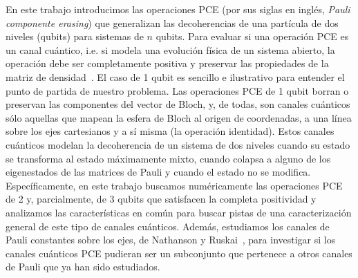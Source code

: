 En este trabajo introducimos las operaciones PCE 
(por sus siglas en inglés, \textit{Pauli componente erasing}) que generalizan 
las decoherencias de una partícula de dos niveles (qubits) para sistemas 
de $n$ qubits. 
Para evaluar si una operación PCE es un canal cuántico, i.e. si modela una evolución
física de un sistema abierto, la operación debe ser completamente positiva
y preservar las propiedades de la matriz de densidad~\citep{bengtsson_zyczkowski_2017}.
El caso de 1 qubit es sencillo e ilustrativo para entender el punto de partida de nuestro problema. 
Las operaciones PCE de 1 qubit borran 
o preservan las componentes del vector de Bloch, y, de todas, son canales 
cuánticos sólo aquellas que mapean 
la esfera de Bloch al origen de coordenadas, a una línea sobre 
los ejes cartesianos y a sí misma (la operación
identidad). Estos canales cuánticos modelan la decoherencia de un
sistema de dos niveles cuando su estado se transforma al estado máximamente 
mixto, cuando colapsa a alguno de los eigenestados
de las matrices de Pauli y cuando el estado no se modifica. 
Específicamente, en este trabajo buscamos numéricamente las operaciones 
PCE de 2 y, parcialmente, de 3 qubits que satisfacen la completa positividad 
y analizamos las características en común para buscar pistas de 
una caracterización general de este tipo de canales cuánticos. Además, estudiamos
los canales de Pauli constantes sobre los ejes, de Nathanson y Ruskai~\cite{nathanson2007pauli},
para investigar si los canales cuánticos PCE pudieran ser un subconjunto que pertenece
a otros canales de Pauli que ya han sido estudiados. 
